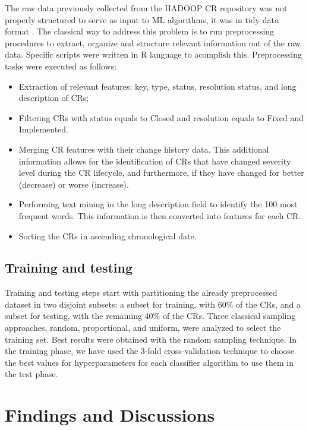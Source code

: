 \documentclass[10pt, conference]{IEEEtran}
\begin{document}
The raw data previously collected from the HADOOP CR repository was not properly structured to serve as input to ML algorithms, it was in tidy data format \cite{DeJonge2013}. The classical way to address this problem is to run preprocessing procedures to extract, organize and structure relevant information out of the raw data. Specific scripts were written in R language to acomplish this. Preprocessing tasks were executed as follows:  

\begin{itemize}
 \item Extraction of relevant features: key, type, status, resolution status, and long description of CRs; 
 \item Filtering CRs with status equals to Closed and resolution equals to Fixed and Implemented. 
 \item Merging CR features with their change history data. This additional information allows for the identification of CRs that have changed severity level during the CR lifecycle, and furthermore, if they have changed for better (decrease) or worse (increase).
 \item Performing text mining in the long description field to identify the 100 most frequent words. This information is then converted into features for each CR.
 \item Sorting the CRs in ascending chronological date. 
\end{itemize}


\subsection{Training and testing}  	\label{subsec:training}

Training and testing steps start with partitioning the already preprocessed dataset in two disjoint subsets: a subset for training, with 60\% of the CRs, and a subset for testing, with the remaining 40\% of the CRs. Three classical sampling approaches, random, proportional, and uniform, were analyzed to select the training set. Best results were obtained with the random sampling technique. In the training phase, we have used the 3-fold cross-validation technique \cite{Zhao2013} to choose the best values for hyperparameters for each classifier algorithm to use them in the test phase. 


\section{Findings and Discussions}  \label{sec:discussion}
\end{document}
